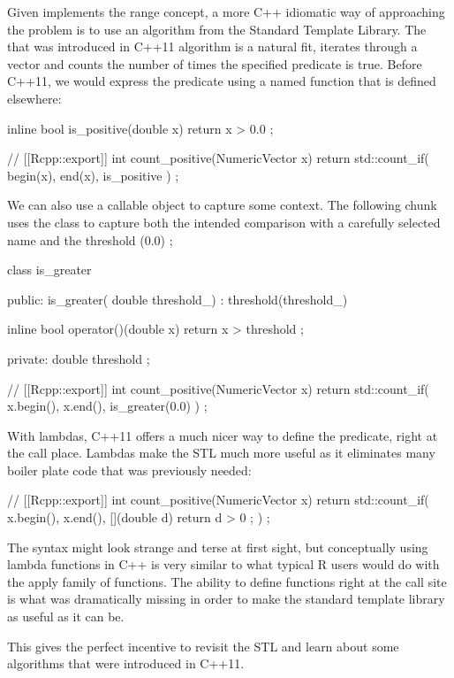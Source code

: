 Given  implements the range concept, a more C++ idiomatic
way of approaching the problem is to use an algorithm from the Standard
Template Library. The  that was introduced
in C++11 algorithm is a natural fit,  iterates through a vector
and counts the number of times the specified predicate is true. Before C++11,
we would express the predicate using a named function that is defined
elsewhere:

\begin{example}
inline bool is_positive(double x){
  return x > 0.0 ;
}

// [[Rcpp::export]]
int count_positive(NumericVector x){
  return std::count_if( begin(x), end(x), is_positive ) ;
}
\end{example}

We can also use a callable object to capture some context. The
following chunk uses the  class to capture both the
intended comparison with a carefully selected name and the threshold (0.0) ;

\begin{example}
class is_greater {
public:
  is_greater( double threshold_) : threshold(threshold_){}

  inline bool operator()(double x){
    return x > threshold ;
  }

private:
  double threshold ;
}
// [[Rcpp::export]]
int count_positive(NumericVector x){
  return std::count_if( x.begin(), x.end(), is_greater(0.0) ) ;
}
\end{example}

With lambdas, C++11 offers a much nicer way to define the predicate, right at the
call place. Lambdas make the STL much more useful as it eliminates
many boiler plate code that was previously needed:

\begin{example}
// [[Rcpp::export]]
int count_positive(NumericVector x){
  return std::count_if( x.begin(), x.end(),
    [](double d){ return d > 0 ;}
  ) ;
}
\end{example}

The syntax might look strange and terse at first sight, but conceptually
using lambda functions in C++ is very similar to what typical R users
would do with the apply family of functions. The ability to define
functions right at the call site is what was dramatically missing in order
to make the standard template library as useful as it can be.

This gives the perfect incentive to revisit the STL and learn about some
algorithms that were introduced in C++11.

